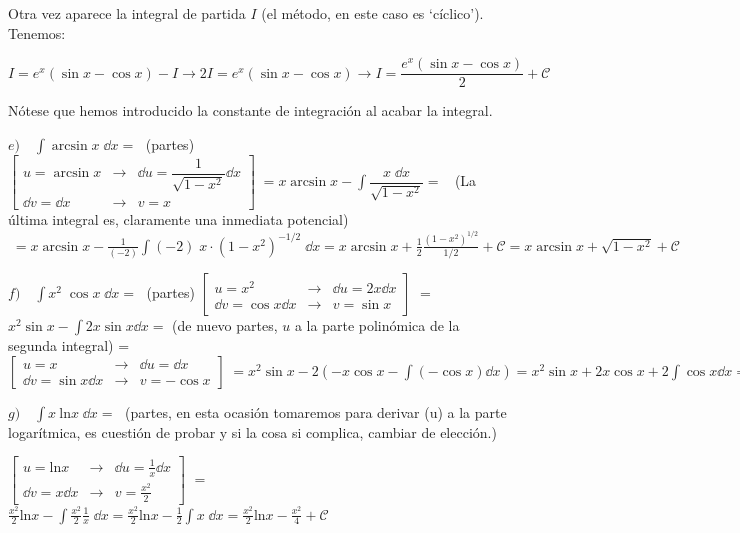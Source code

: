 \begin{ejem}
	Otra vez aparece la integral de partida $I$ (el método, en este caso es `cíclico'). Tenemos:
	
	$\displaystyle I= e^x (\sin x - \cos x) - I \to 2I = e^x (\sin x - \cos x)  \to I = \dfrac {e^x (\sin x - \cos x)}{2} + \mathcal C$
	
	Nótese que hemos introducido la constante de integración al acabar la integral.
	
	$e) \quad \displaystyle \int \arcsin x \; \dd x= \; $ (partes)
	$ \left[ \begin{matrix} u=\arcsin x & \to & \dd u = \dfrac {1}{\sqrt {1-x^2}} \dd x \\ \dd v= \dd x  & \to & v=x \end{matrix} \right] \; =\displaystyle x \arcsin x - \int \dfrac {x \; \dd x}{\sqrt{1-x^2}} =\; \;  $ 
	(La última integral es, claramente una inmediata potencial) 
	$\; = \displaystyle x \arcsin x - \frac {1}{(-2)} \int (-2) \; x \cdot (1-x^2)^{-1/2} \; \dd x= x \arcsin x + \frac 1 2 \frac {(1-x^2)^{1/2}}{1/2}+\mathcal C= x \arcsin x + \sqrt{1-x^2}+\mathcal C$
	
	
	$f) \quad \displaystyle \int x^2 \; \cos x \; \dd x= \; $ \small{(partes) $ \left[ \begin{matrix} u=x^2 & \to & \dd u= 2x \dd x \\\dd v= \cos x \dd x  & \to & v=\sin x \end{matrix} \right] \; $} \normalsize{=} $ \displaystyle x^2 \sin x - \int 2x\sin x \dd x=$ \small{(de nuevo partes, $u$ a la parte polinómica de la segunda integral)} \normalsize{=} $ \left[ \begin{matrix} u=x   & \to & \dd u=\dd x \\ \dd v = \sin x \dd x & \to & v= -\cos x \end{matrix} \right] \; =\displaystyle x^2 \sin x - 2 \left( -x\cos x - \int (-\cos x) \dd x \right)= x^2 \sin x + 2x\cos x + 2\int \cos x \dd x = x^2\sin x +2x\cos x+2\sin x +\mathcal C $
	
	$g) \quad \displaystyle \int x \: \mathrm{ln}x \; \dd x= \;$ (partes, en esta ocasión tomaremos para derivar (u) a la parte logarítmica, es cuestión de probar y si la cosa si complica, cambiar de elección.)
	
	\small{$ \displaystyle \left[ \begin{matrix} u=\mathrm{ln}x & \to & \dd u = \frac 1 x \dd x \\ \dd v = x \dd x & \to & v= \frac {x^2}{2} \end{matrix} \right]\;$} \normalsize{=} $\frac {x^2} {2} \mathrm{ln} x- \int \frac {x^2}{2} \frac 1 x \; \dd x  = \frac {x^2} {2} \mathrm{ln} x- \frac 1 2 \int x\; \dd x =  \frac {x^2} {2} \mathrm{ln} x -\frac {x^2}{4}+\mathcal C$
	

\end{ejem}
